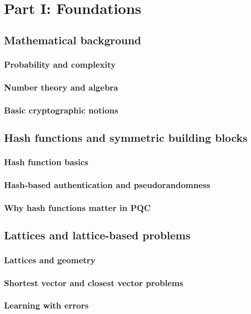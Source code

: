 \part{Part I: Foundations}
\chapter{Mathematical background}
\section{Probability and complexity}
\section{Number theory and algebra}
\section{Basic cryptographic notions}

\chapter{Hash functions and symmetric building blocks}
\section{Hash function basics}
\section{Hash-based authentication and pseudorandomness}
\section{Why hash functions matter in PQC}

\chapter{Lattices and lattice-based problems}
\section{Lattices and geometry}
\section{Shortest vector and closest vector problems}
\section{Learning with errors}

